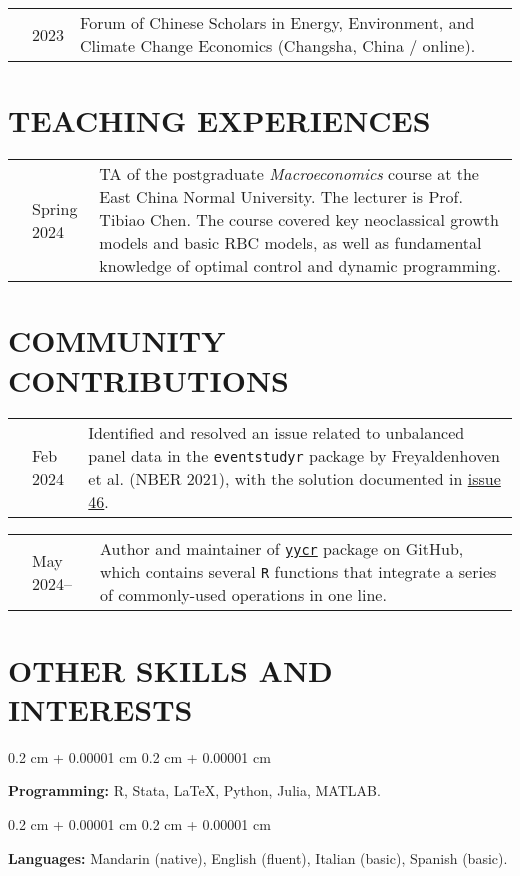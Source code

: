 \documentclass[10pt, letterpaper]{article}
\newenvironment{onecolentry}{
    \begin{adjustwidth}{
        0.2 cm + 0.00001 cm
    }{
        0.2 cm + 0.00001 cm
    }
}{
    \end{adjustwidth}
} %
\newenvironment{paper}{\vspace{.2cm}\begin{samepage}\begin{onecolentry}}{\end{onecolentry}\end{samepage}\vspace{0.2cm}}
\begin{document}
\vspace{.2cm}

\begin{tabularx}{\textwidth}{@{}p{.2cm} @{}p{1cm} X@{}}
& 2023 & Forum of Chinese Scholars in Energy, Environment, and Climate Change Economics (Changsha, China / online).
\end{tabularx}

\vspace{.2cm}



\section{TEACHING EXPERIENCES}

\vspace{.2cm}
\begin{tabularx}{\textwidth}{@{}p{.2cm} @{}p{2cm} X@{}}
	& Spring 2024 & TA of the postgraduate \textit{Macroeconomics} course at the East China Normal University. The lecturer is Prof. Tibiao Chen. The course covered key neoclassical growth models and basic RBC models, as well as fundamental knowledge of optimal control and dynamic programming.
\end{tabularx}


\section{COMMUNITY CONTRIBUTIONS}

\vspace{.2cm}
\begin{tabularx}{\textwidth}{@{}p{.2cm} @{}p{2cm} X@{}}
	& Feb 2024 & Identified and resolved an issue related to unbalanced panel data in the \texttt{eventstudyr} package by Freyaldenhoven et al. (NBER 2021), with the solution documented in \href{https://github.com/JMSLab/eventstudyr/issues/46}{issue 46}.
\end{tabularx}

\vspace{.2cm}
\begin{tabularx}{\textwidth}{@{}p{.2cm} @{}p{2cm} X@{}}
	& May 2024-- & Author and maintainer of \href{https://github.com/yang-yuchuan/yycr}{\texttt{yycr}} package on GitHub, which contains several \texttt{R} functions that integrate a series of commonly-used operations in one line.
\end{tabularx}


\section{OTHER SKILLS AND INTERESTS}

\begin{paper}
	\textbf{Programming:} R, Stata, \LaTeX, Python, Julia, MATLAB.
\end{paper}

\begin{paper}
	\textbf{Languages:} Mandarin (native), English (fluent), Italian (basic), Spanish (basic).
\end{paper}
\end{document}
